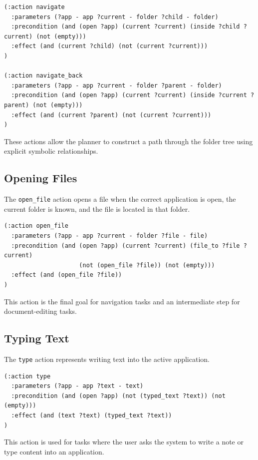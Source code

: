 \begin{lstlisting}
(:action navigate
  :parameters (?app - app ?current - folder ?child - folder)
  :precondition (and (open ?app) (current ?current) (inside ?child ?current) (not (empty)))
  :effect (and (current ?child) (not (current ?current)))
)

(:action navigate_back
  :parameters (?app - app ?current - folder ?parent - folder)
  :precondition (and (open ?app) (current ?current) (inside ?current ?parent) (not (empty)))
  :effect (and (current ?parent) (not (current ?current)))
)
\end{lstlisting}

These actions allow the planner to construct a path through the folder tree using explicit symbolic relationships.

\subsection{Opening Files}

The \texttt{open\_file} action opens a file when the correct application is open, the current folder is known, and the file is located in that folder.

\begin{lstlisting}
(:action open_file
  :parameters (?app - app ?current - folder ?file - file)
  :precondition (and (open ?app) (current ?current) (file_to ?file ?current)
                     (not (open_file ?file)) (not (empty)))
  :effect (and (open_file ?file))
)
\end{lstlisting}

This action is the final goal for navigation tasks and an intermediate step for document-editing tasks.

\subsection{Typing Text}

The \texttt{type} action represents writing text into the active application.

\begin{lstlisting}
(:action type
  :parameters (?app - app ?text - text)
  :precondition (and (open ?app) (not (typed_text ?text)) (not (empty)))
  :effect (and (text ?text) (typed_text ?text))
)
\end{lstlisting}

This action is used for tasks where the user asks the system to write a note or type content into an application.

